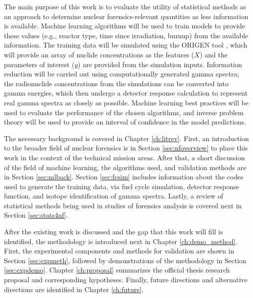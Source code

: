 The main purpose of this work is to evaluate the utility of statistical methods
as an approach to determine nuclear forensics-relevant quantities as less
information is available. Machine learning algorithms will be used to train
models to provide these values (e.g., reactor type, time since irradiation,
burnup) from the available information. The training data will be simulated
using the ORIGEN tool , which will provide an array of nuclide
concentrations as the features ($X$) and the parameters of interest ($y$) are
provided from the simulation inputs.  Information reduction will be carried out
using computationally generated gamma spectra; the radionuclide concentrations
from the simulations can be converted into gamma energies, which then undergo a
detector response calculation to represent real gamma spectra as closely as
possible. Machine learning best practices will be used to evaluate the
performance of the chosen algorithms, and inverse problem theory will
be used to provide an interval of confidence in the model predictions.

The necessary background is covered in Chapter \ref{ch:litrev}.  First, an
introduction to the broader field of nuclear forensics is in Section
\ref{sec:nfoverview} to place this work in the context of the technical mission
areas. After that, a short discussion of the field of machine learning, the
algorithms used, and validation methods are in Section \ref{sec:mlback}.
Section \ref{sec:fcsim} includes information about the codes used to generate
the training data, via fuel cycle simulation, detector response function, and
isotope identification of gamma spectra.  Lastly, a review of statistical
methods being used in studies of forensics analysis is covered next in Section
\ref{sec:stats4nf}. 


After the existing work is discussed and the gap that this work will fill is
identified, the methodology is introduced next in Chapter \ref{ch:demo_method}.
First, the experimental components and methods for validation are shown in
Section \ref{sec:expmeth}, followed by demonstrations of the methodology in
Section \ref{sec:expdemo}.  Chapter \ref{ch:proposal} summarizes the official
thesis research proposal and corresponding hypotheses. Finally, future
directions and alternative directions are identified in Chapter
\ref{ch:future}.
